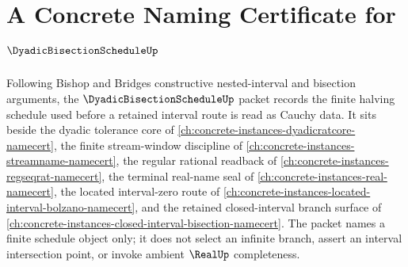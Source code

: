 \chapter{A Concrete Naming Certificate for $\DyadicBisectionScheduleUp$}
\label{ch:concrete-instances-dyadic-bisection-schedule-namecert}

Following Bishop and Bridges constructive nested-interval and bisection arguments, the $\DyadicBisectionScheduleUp$ packet records the finite halving schedule used before a retained interval route is read as Cauchy data. It sits beside the dyadic tolerance core of \autoref{ch:concrete-instances-dyadicratcore-namecert}, the finite stream-window discipline of \autoref{ch:concrete-instances-streamname-namecert}, the regular rational readback of \autoref{ch:concrete-instances-regseqrat-namecert}, the terminal real-name seal of \autoref{ch:concrete-instances-real-namecert}, the located interval-zero route of \autoref{ch:concrete-instances-located-interval-bolzano-namecert}, and the retained closed-interval branch surface of \autoref{ch:concrete-instances-closed-interval-bisection-namecert}. The packet names a finite schedule object only; it does not select an infinite branch, assert an interval intersection point, or invoke ambient $\RealUp$ completeness.


